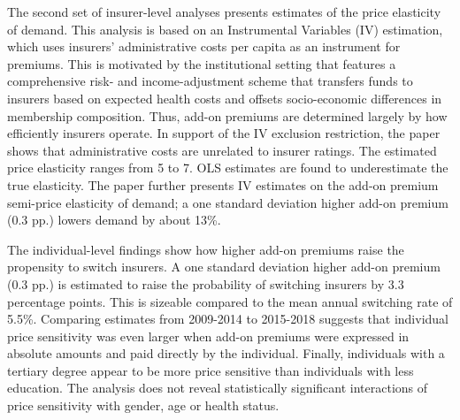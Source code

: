 \documentclass[a4paper, 11pt, english]{article}
\begin{document}
The second set of insurer-level analyses presents estimates of the price elasticity of demand. This analysis is based on an Instrumental Variables (IV) estimation, which uses insurers' administrative costs per capita as an instrument for premiums. This is motivated by the institutional setting that features a comprehensive risk- and income-adjustment scheme that transfers funds to insurers based on expected health costs and offsets socio-economic differences in membership composition. Thus, add-on premiums are determined largely by how efficiently insurers operate. In support of the IV exclusion restriction, the paper shows that administrative costs are unrelated to insurer ratings. The estimated price elasticity ranges from 5 to 7. OLS estimates are found to underestimate the true elasticity. The paper further presents IV estimates on the add-on premium semi-price elasticity of demand; a one standard deviation higher add-on premium (0.3 pp.) lowers demand by about 13\%.

The individual-level findings show how higher add-on premiums raise the propensity to switch insurers. A one standard deviation higher add-on premium (0.3 pp.) is estimated to raise the probability of switching insurers by 3.3 percentage points. This is sizeable compared to the mean annual switching rate of 5.5\%. Comparing estimates from 2009-2014 to 2015-2018 suggests that individual price sensitivity was even larger when add-on premiums were expressed in absolute amounts and paid directly by the individual. Finally, individuals with a tertiary degree appear to be more price sensitive than individuals with less education. The analysis does not reveal statistically significant interactions of price sensitivity with gender, age or health status. 
\end{document}
